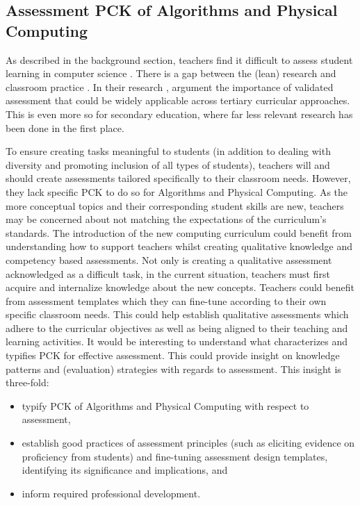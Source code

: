 \subsection*{Assessment PCK of Algorithms and Physical Computing}
As described in the background section, teachers find it difficult to assess student learning in computer science \cite{yadav2016pck}. There is a gap between the (lean) research and classroom practice \cite{Yadav2015}. In their research , argument the importance of validated assessment that could be widely applicable across tertiary curricular approaches. This is even more so for secondary education, where far less relevant research has been done in the first place.






To ensure creating tasks meaningful to students (in addition to dealing with diversity and promoting inclusion of all types of students), teachers will and should create assessments tailored specifically to their classroom needs. However, they lack specific PCK to do so for Algorithms and Physical Computing. As the more conceptual topics and their corresponding student skills are new, teachers may be concerned about not matching the expectations of the curriculum's standards. The introduction of the new computing curriculum could benefit from understanding how to support teachers whilst creating qualitative knowledge and competency based assessments. Not only is creating a qualitative assessment acknowledged as a difficult task, in the current situation, teachers must first acquire and internalize knowledge about the new concepts. Teachers could benefit from assessment templates which they can fine-tune according to their own specific classroom needs. This could help establish qualitative assessments which adhere to the curricular objectives as well as being aligned to their teaching and learning activities.  It would be interesting to understand what characterizes and typifies PCK for effective assessment. This could provide insight on knowledge patterns and (evaluation) strategies with regards to assessment. This insight is three-fold:
\begin{itemize}
\item typify PCK of Algorithms and Physical Computing with respect to assessment,
\item establish good practices of assessment principles (such as eliciting evidence on proficiency from students) and fine-tuning assessment design templates, identifying its significance and implications, and
\item inform required professional development.
\end{itemize}

